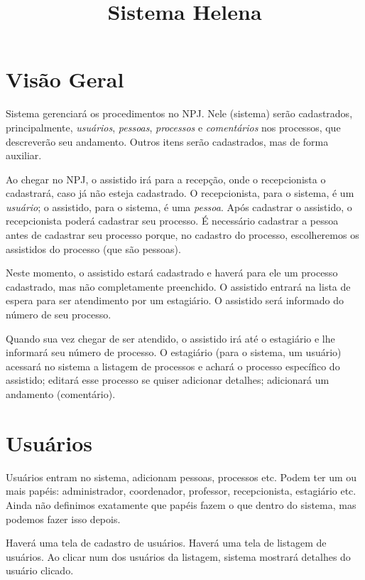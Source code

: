 \documentclass[a4paper]{article}
\title{Sistema Helena}
\author{}
\date{}
\begin{document}
\maketitle
\tableofcontents

\newpage

\section{Visão Geral}

Sistema gerenciará os procedimentos no NPJ. Nele (sistema) serão
cadastrados, principalmente, \textit{usuários}, \textit{pessoas},
\textit{processos} e \textit{comentários} nos processos, que
descreverão seu andamento. Outros itens serão cadastrados, mas de
forma auxiliar.

Ao chegar no NPJ, o assistido irá para a recepção, onde o
recepcionista o cadastrará, caso já não esteja cadastrado. O
recepcionista, para o sistema, é um \textit{usuário}; o assistido,
para o sistema, é uma \textit{pessoa}. Após cadastrar o assistido, o
recepcionista poderá cadastrar seu processo. É necessário cadastrar a
pessoa antes de cadastrar seu processo porque, no cadastro do
processo, escolheremos os assistidos do processo (que são pessoas).

Neste momento, o assistido estará cadastrado e haverá para ele um
processo cadastrado, mas não completamente preenchido.  O assistido
entrará na lista de espera para ser atendimento por um estagiário. O
assistido será informado do número de seu processo.

Quando sua vez chegar de ser atendido, o assistido irá até o
estagiário e lhe informará seu número de processo. O estagiário (para
o sistema, um usuário) acessará no sistema a listagem de processos e
achará o processo específico do assistido; editará esse processo se
quiser adicionar detalhes; adicionará um andamento (comentário).

\section{Usuários}

Usuários entram no sistema, adicionam pessoas, processos etc. Podem
ter um ou mais papéis: administrador, coordenador, professor,
recepcionista, estagiário etc. Ainda não definimos exatamente que
papéis fazem o que dentro do sistema, mas podemos fazer isso depois.

Haverá uma tela de cadastro de usuários.  Haverá uma tela de listagem
de usuários. Ao clicar num dos usuários da listagem, sistema mostrará
detalhes do usuário clicado.
\end{document}
